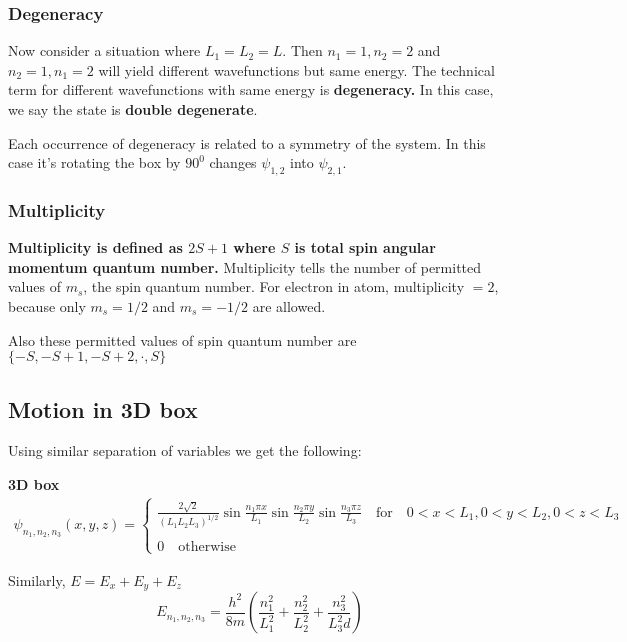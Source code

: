 \documentclass[11pt]{article}
\theoremstyle{definition}
\begin{document}
\subsubsection{Degeneracy}

Now consider a situation where $L_1 = L_2 = L$. Then $n_1 = 1, n_2 = 2$ and $n_2 = 1, n_1 = 2$ will yield different wavefunctions but same energy. The technical term for different wavefunctions with same energy is \textbf{degeneracy.} In this case, we say the state is \textbf{double degenerate}. 

Each occurrence of degeneracy is related to a symmetry of the system. In this case it's rotating the box by $90^0$ changes $\psi_{1,2}$ into $\psi_{2,1}$.

\subsubsection{Multiplicity}
\textbf{Multiplicity is defined as $2S+1$ where $S$ is total spin angular momentum quantum number.} Multiplicity tells the number of permitted values of $m_s$, the spin quantum number. For electron in atom, multiplicity $= 2$, because only $m_s = 1/2$ and $m_s = -1/2$ are allowed.

Also these permitted values of spin quantum number are $\{-S, -S+1, -S+2 ,\cdot , S \}$
\subsection{Motion in 3D box}

Using similar separation of variables we get the following:
\begin{shaded}
\textbf{3D box}
\begin{gather*}
    \psi_{n_1, n_2, n_3}(x,y,z) = \begin{cases}
    \frac{2\sqrt{2}}{(L_1 L_2 L_3)^{1/2}} \sin{\frac{n_1 \pi x}{L_1}} \sin{\frac{n_2 \pi y}{L_2}} \sin{\frac{n_3 \pi z}{L_3}} \quad \text{for} \quad 0<x<L_1, 0<y<L_2, 0<z<L_3\\
    \\
    0 \quad \text{otherwise}
    \end{cases}
\end{gather*}

Similarly, $E = E_x + E_y + E_z$
\begin{equation*}
    E_{n_1, n_2,n_3} = \frac{h^2}{8m} \left(\frac{n_1^2}{L_1^2} + \frac{n_2^2}{L_2^2} + \frac{n_3^2}{L_3^2d}\right)
\end{equation*}
\end{shaded}
\end{document}
